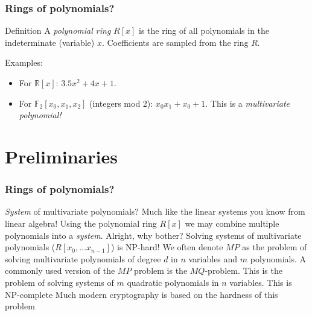 \documentclass{beamer}
\begin{document}
\begin{frame}
    \frametitle{Rings of polynomials?}
    \begin{block}{Definition}
        A \textit{polynomial ring} $R[x]$ is the ring of all polynomials in the indeterminate (variable) $x$. Coefficients are sampled from the ring $R$.
    \end{block} 
    Examples:
    \begin{itemize}
        \item<2-> For $\mathbb{R}[x]$: $3.5x^2 + 4x + 1$.
        \item<3-> For $\mathbb{F}_2[x_0, x_1, x_2]$ (integers mod 2): $x_0x_1 + x_0 + 1$. This is a \textit{multivariate polynomial!}
    \end{itemize}
\end{frame}

\section{Preliminaries}
\begin{frame}
    \frametitle{Rings of polynomials?}
    \begin{outline}
        \1 \textit{System} of multivariate polynomials?
            \2 Much like the linear systems you know from linear algebra!
            \2 Using the polynomial ring $R[x]$ we may combine multiple polynomials into a \textit{system}.
        \1 Alright, why bother?
            \2 Solving systems of multivariate polynomials ($R[x_0,\dots x_{n - 1}]$) is NP-hard!
                \3 We often denote $MP$ as the problem of solving multivariate polynomials of degree $d$ in $n$ variables and $m$ polynomials.
            \2 A commonly used version of the $MP$ problem is the $MQ$-problem.
                \3 This is the problem of solving systems of $m$ quadratic polynomials in $n$ variables.
                \3 This is NP-complete
                \3 Much modern cryptography is based on the hardness of this problem
    \end{outline}
\end{frame}
\end{document}
